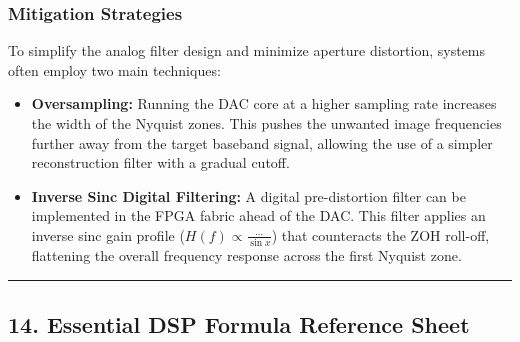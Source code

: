 \documentclass[
]{article}
\providecommand{\tightlist}{%
  \setlength{\itemsep}{0pt}\setlength{\parskip}{0pt}}
\begin{document}
\subsubsection{Mitigation Strategies}\label{mitigation-strategies}

To simplify the analog filter design and minimize aperture distortion,
systems often employ two main techniques:

\begin{itemize}
\tightlist
\item
  \textbf{Oversampling:} Running the DAC core at a higher sampling rate
  increases the width of the Nyquist zones. This pushes the unwanted
  image frequencies further away from the target baseband signal,
  allowing the use of a simpler reconstruction filter with a gradual
  cutoff.
\item
  \textbf{Inverse Sinc Digital Filtering:} A digital pre-distortion
  filter can be implemented in the FPGA fabric ahead of the DAC. This
  filter applies an inverse sinc gain profile
  (\(H(f) \propto \frac{\dots}{\sin x}\)) that counteracts the ZOH
  roll-off, flattening the overall frequency response across the first
  Nyquist zone.
\end{itemize}

\begin{center}\rule{0.5\linewidth}{0.5pt}\end{center}

\subsection{14. Essential DSP Formula Reference
Sheet}\label{essential-dsp-formula-reference-sheet}
\end{document}
